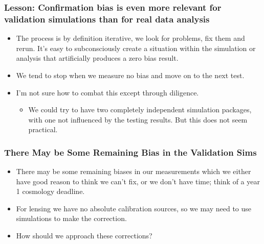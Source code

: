 \documentclass{beamer}
\begin{document}
\frame
{

    \frametitle{Lesson: Confirmation bias is even more relevant for validation
    simulations than for real data analysis }


    \begin{itemize}

        \item The process is by definition iterative, we look for problems, fix
            them and rerun.  It's easy to subconsciously create a situation
            within the simulation or analysis that artificially produces
            a zero bias result.

        \item We tend to stop when we measure no bias and move on to the next
            test.

        \item I'm not sure how to combat this except through diligence.
            \begin{itemize}

                \item We could try to have two completely independent simulation
                    packages, with one not influenced by the testing results.  But
                    this does not seem practical.

            \end{itemize}

    \end{itemize}

}

\frame
{

    \frametitle{There May be Some Remaining Bias in the Validation Sims}

    \begin{itemize}

        \item There may be some remaining biases in our measurements which we
            either have good reason to think we can't fix, or we don't
            have time; think of a year 1 cosmology deadline.

        \item For lensing we have no absolute calibration sources, so we may need to use
            simulations to make the correction.

        \item How should we approach these corrections?

    \end{itemize}

}
\end{document}
